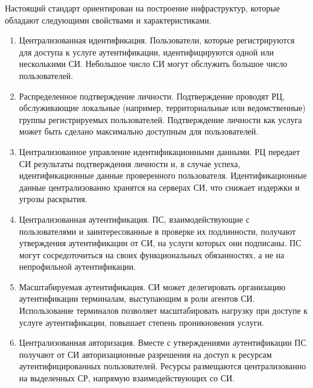 Настоящий стандарт ориентирован на построение инфраструктур, которые обладают
следующими свойствами и характеристиками.

\begin{enumerate}
\item
Централизованная идентификация.
%
Пользователи, которые регистрируются для доступа к услуге аутентификации, 
идентифицируются одной или несколькими СИ. 
%
Небольшое число СИ могут обслужить большое число пользователей.

\item
Распределенное подтверждение личности.
%
Подтверждение проводят РЦ, обслуживающие локальные (например, 
территориальные или ведомственные) группы регистрируемых пользователей. 
%
Подтверждение личности как услуга может быть сделано максимально доступным для 
пользователей. 

\item
Централизованное управление идентификационными данными.
%
РЦ передает СИ результаты подтверждения личности и, в случае успеха, 
идентификационные данные проверенного пользователя.
%
Идентификационные данные централизованно хранятся на серверах СИ, что 
снижает издержки и угрозы раскрытия.

\item
Централизованная аутентификация.
%
ПС, взаимодействующие с пользователями и заинтересованные в проверке 
их подлинности, получают утверждения аутентификации от СИ, на услуги которых 
они подписаны.
%
ПС могут сосредоточиться на своих функциональных обязанностях, а не на 
непрофильной аутентификации.

\item
Масштабируемая аутентификация.
%
СИ может делегировать организацию аутентификации терминалам, выступающим в роли
агентов СИ. Использование терминалов позволяет масштабировать нагрузку при
доступе к услуге аутентификации, повышает степень проникновения услуги.

\item
Централизованная авторизация. 
%
Вместе с утверждениями аутентификации ПС получают от СИ авторизационные 
разрешения на доступ к ресурсам аутентифицированных пользователей. Ресурсы 
размещаются централизованно на выделенных СР, напрямую взаимодействующих со СИ.
\end{enumerate}

